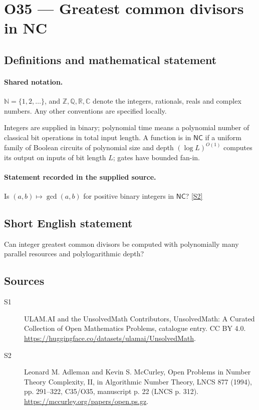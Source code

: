 \documentclass[11pt]{article}
\newcommand{\sref}[2]{\hyperlink{source:#1:#2}{[S#2]}}
\begin{document}
\section{O35 — Greatest common divisors in NC}\label{statement}

\subsection{Definitions and mathematical statement}

\paragraph{Shared notation.}$\mathbb N=\{1,2,\ldots\}$, and $\mathbb Z,\mathbb Q,\mathbb R,\mathbb C$ denote the integers, rationals, reals and complex numbers. Any other conventions are specified locally.


Integers are supplied in binary; polynomial time means a polynomial number of classical bit operations in total input length. A function is in $\mathsf{NC}$ if a uniform family of Boolean circuits of polynomial size and depth $(\log L)^{O(1)}$ computes its output on inputs of bit length $L$; gates have bounded fan-in.
\paragraph{Statement recorded in the supplied source.}
Is $(a,b)\mapsto\gcd(a,b)$ for positive binary integers in $\mathsf{NC}$? \sref{statement}{2}
\subsection{Short English statement}
Can integer greatest common divisors be computed with polynomially many parallel resources and polylogarithmic depth?
\subsection{Sources}
\begin{description}
\item[\hypertarget{source:statement:1}{S1}] ULAM.AI and the UnsolvedMath Contributors, UnsolvedMath: A Curated Collection of Open Mathematics Problems, catalogue entry. CC BY 4.0. \url{https://huggingface.co/datasets/ulamai/UnsolvedMath}.
\item[\hypertarget{source:statement:2}{S2}] Leonard M. Adleman and Kevin S. McCurley, Open Problems in Number Theory Complexity, II, in Algorithmic Number Theory, LNCS 877 (1994), pp. 291--322, C35/O35, manuscript p. 22 (LNCS p. 312). \url{https://mccurley.org/papers/open.ps.gz}.
\end{description}
\label{end:statement}
\end{document}
